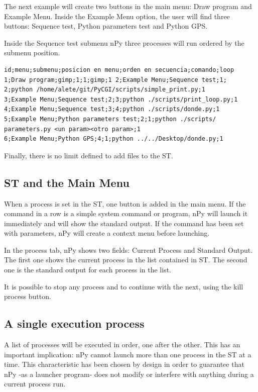 \documentclass[a4paper,10pt]{article}
\begin{document}
The next example will create two buttons in the main menu: Draw program and Example Menu. Inside the Example Menu option, the user will find three buttons: Sequence test, Python parameters test and Python GPS.

Inside the Sequence test submenu nPy three processes will run ordered by the submenu position.

\begin{verbatim}
id;menu;submenu;posicion en menu;orden en secuencia;comando;loop 
1;Draw program;gimp;1;1;gimp;1 2;Example Menu;Sequence test;1;
2;python /home/alete/git/PyCGI/scripts/simple_print.py;1 
3;Example Menu;Sequence test;2;3;python ./scripts/print_loop.py;1 
4;Example Menu;Sequence test;3;4;python ./scripts/donde.py;1 
5;Example Menu;Python parameters test;2;1;python ./scripts/
parameters.py <un param><otro param>;1 
6;Example Menu;Python GPS;4;1;python ../../Desktop/donde.py;1
\end{verbatim}

\noindent Finally, there is no limit defined to add files to the ST.

\subsection{ST and the Main Menu}

When a process is set in the ST, one button is added in the main menu. If the command in a row is a simple system command or program, nPy will launch it immediately and will show the standard output. If the command has been set with parameters, nPy will create a context menu before launching.

In the process tab, nPy shows two fields: Current Process and Standard Output. The first one shows the current process in the list contained in ST. The second one is the standard output for each process in the list.

It is possible to stop any process and to continue with the next, using the kill process button.

\subsection{A single execution process}

A list of processes will be executed in order, one after the other. This has an important implication: nPy cannot launch more than one process in the ST at a time. This characteristic has been chosen by design in order to guarantee that nPy -as a launcher program- does not modify or interfere with anything during a current process run.
\end{document}
